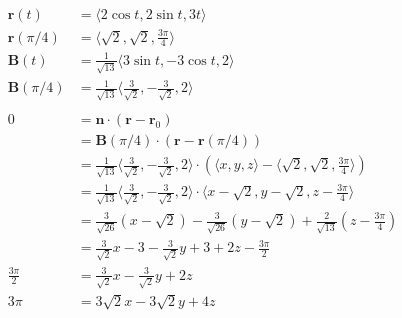 \documentclass{article}
\begin{document}
\begin{align*}
  \mathbf{r}(t)       & = \langle 2 \cos t, 2 \sin t, 3 t \rangle                                                                                                                                           \\
  \mathbf{r}(\pi / 4) & = \langle \sqrt{2}, \sqrt{2}, \frac{3 \pi}{4} \rangle                                                                                                                               \\
  \mathbf{B}(t)       & = \frac{1}{\sqrt{13}} \langle 3 \sin t, -3 \cos t, 2 \rangle                                                                                                                        \\
  \mathbf{B}(\pi / 4) & = \frac{1}{\sqrt{13}} \langle \frac{3}{\sqrt{2}}, -\frac{3}{\sqrt{2}}, 2 \rangle                                                                                                    \\ \\
  0                   & = \mathbf{n} \cdot (\mathbf{r} - \mathbf{r}_0)                                                                                                                                      \\
                      & = \mathbf{B}(\pi / 4) \cdot (\mathbf{r} - \mathbf{r}(\pi / 4))                                                                                                                      \\
                      & = \frac{1}{\sqrt{13}} \langle \frac{3}{\sqrt{2}}, -\frac{3}{\sqrt{2}}, 2 \rangle \cdot \left( \langle x, y, z \rangle - \langle \sqrt{2}, \sqrt{2}, \frac{3 \pi}{4} \rangle \right) \\
                      & = \frac{1}{\sqrt{13}} \langle \frac{3}{\sqrt{2}}, -\frac{3}{\sqrt{2}}, 2 \rangle \cdot \langle x - \sqrt{2}, y - \sqrt{2}, z - \frac{3 \pi}{4} \rangle                              \\
                      & = \frac{3}{\sqrt{26}} (x - \sqrt{2}) - \frac{3}{\sqrt{26}} (y - \sqrt{2}) + \frac{2}{\sqrt{13}} \left( z - \frac{3 \pi}{4} \right)                                                  \\
                      & = \frac{3}{\sqrt{2}} x - 3 - \frac{3}{\sqrt{2}} y + 3 + 2 z - \frac{3 \pi}{2}                                                                                                       \\
  \frac{3 \pi}{2}     & = \frac{3}{\sqrt{2}} x - \frac{3}{\sqrt{2}} y + 2 z                                                                                                                                 \\
  3 \pi               & = 3 \sqrt{2} x - 3 \sqrt{2} y + 4 z
\end{align*}
\end{document}
